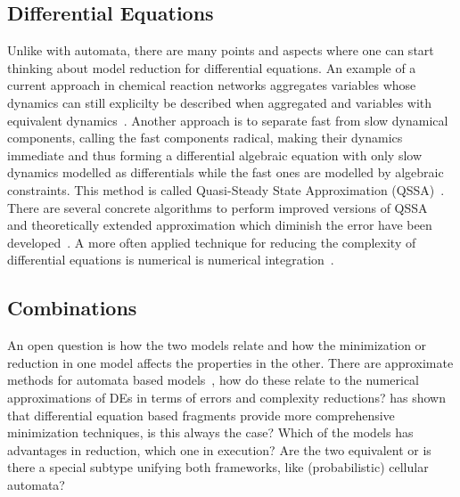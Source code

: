 \documentclass[11pt, rgb]{scrartcl}
\begin{document}
\subsection{Differential Equations}
Unlike with automata, there are many points and aspects where one can start thinking about model reduction for differential equations. 
An example of a current approach in chemical reaction networks aggregates variables whose dynamics can still explicilty be described when aggregated and variables with equivalent dynamics~\autocite{Cardelli2017MaximalAO}.
Another approach is to separate fast from slow dynamical components, calling the fast components radical, making their dynamics immediate and thus forming a differential algebraic equation with only slow dynamics modelled as differentials while the fast ones are modelled by algebraic constraints. 
This method is called Quasi-Steady State Approximation (QSSA)~\autocite{briggs1925note}.
There are several concrete algorithms to perform improved versions of QSSA~\autocite{boulier2009towards} and theoretically extended approximation which diminish the error have been developed~\autocite{deuflhard1996dynamic}.
A more often applied technique for reducing the complexity of differential equations is numerical is numerical integration~\autocite{curtiss1952integration, kutta1901beitrag, orszag1969numerical}. 


\subsection{Combinations}
An open question is how the two models relate and how the minimization or reduction in one model affects the properties in the other. There are approximate methods for automata based models~\autocite{bobbio1986aggregation, geiger}, how do these relate to the numerical approximations of DEs in terms of errors and complexity reductions? \autocite{mc_agg_crn} has shown that differential equation based fragments provide more comprehensive minimization techniques, is this always the case? Which of the models has advantages in reduction, which one in execution? Are the two equivalent or is there a special subtype unifying both frameworks, like (probabilistic) cellular automata\autocite{von1966theory, olariu2005cellular, grinstein1985statistical}?

\printbibliography

\appendix
\end{document}
